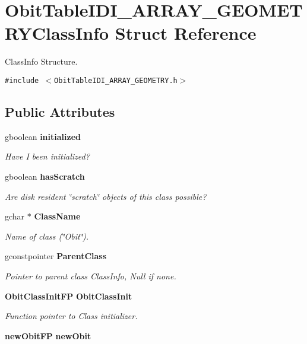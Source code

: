 \section{Obit\-Table\-IDI\_\-ARRAY\_\-GEOMETRYClass\-Info Struct Reference}
\label{structObitTableIDI__ARRAY__GEOMETRYClassInfo}
Class\-Info Structure.  


{\tt \#include $<$Obit\-Table\-IDI\_\-ARRAY\_\-GEOMETRY.h$>$}

\subsection*{Public Attributes}
\begin{CompactItemize}
\item 
gboolean {\bf initialized}
\begin{CompactList}\small\item\em Have I been initialized? \item\end{CompactList}\item 
gboolean {\bf has\-Scratch}
\begin{CompactList}\small\item\em Are disk resident \char`\"{}scratch\char`\"{} objects of this class possible? \item\end{CompactList}\item 
gchar $\ast$ {\bf Class\-Name}
\begin{CompactList}\small\item\em Name of class (\char`\"{}Obit\char`\"{}). \item\end{CompactList}\item 
gconstpointer {\bf Parent\-Class}
\begin{CompactList}\small\item\em Pointer to parent class Class\-Info, Null if none. \item\end{CompactList}\item 
{\bf Obit\-Class\-Init\-FP} {\bf Obit\-Class\-Init}
\begin{CompactList}\small\item\em Function pointer to Class initializer. \item\end{CompactList}\item 
{\bf new\-Obit\-FP} {\bf new\-Obit}

\end{CompactItemize}
